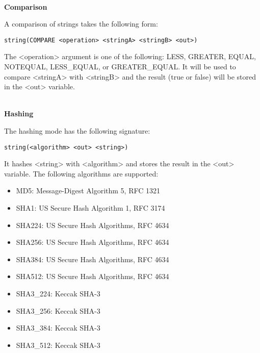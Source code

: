 \hspace*{\fill} \\ %
\noindent
\textbf{Comparison}

A comparison of strings takes the following form:

\begin{lstlisting}[style=styleCMake]
string(COMPARE <operation> <stringA> <stringB> <out>)
\end{lstlisting}

The <operation> argument is one of the following: LESS, GREATER, EQUAL, NOTEQUAL, LESS\_EQUAL, or GREATER\_EQUAL. It will be used to compare <stringA> with <stringB> and the result (true or false) will be stored in the <out> variable.

\hspace*{\fill} \\ %
\noindent
\textbf{Hashing}

The hashing mode has the following signature:

\begin{lstlisting}[style=styleCMake]
string(<algorithm> <out> <string>)
\end{lstlisting}

It hashes <string> with <algorithm> and stores the result in the <out> variable. The following algorithms are supported:

\begin{itemize}
\item 
MD5: Message-Digest Algorithm 5, RFC 1321

\item 
SHA1: US Secure Hash Algorithm 1, RFC 3174

\item 
SHA224: US Secure Hash Algorithms, RFC 4634

\item 
SHA256: US Secure Hash Algorithms, RFC 4634

\item
SHA384: US Secure Hash Algorithms, RFC 4634

\item
SHA512: US Secure Hash Algorithms, RFC 4634

\item
SHA3\_224: Keccak SHA-3

\item
SHA3\_256: Keccak SHA-3

\item 
SHA3\_384: Keccak SHA-3

\item 
SHA3\_512: Keccak SHA-3
\end{itemize}

